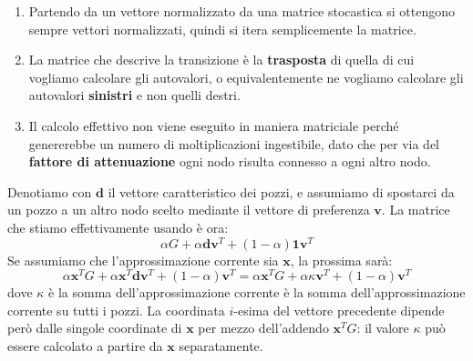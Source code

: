 \documentclass[\main/main.tex]{subfiles}
\begin{document}
\begin{multicols}{2}
\begin{observation}
    \begin{enumerate}
        \item Partendo da un vettore normalizzato da una matrice stocastica si ottengono sempre vettori normalizzati, quindi si itera semplicemente la matrice.
        \item La matrice che descrive la transizione è la \textbf{trasposta} di quella di cui vogliamo calcolare gli autovalori, o equivalentemente ne vogliamo calcolare gli autovalori \textbf{sinistri} e non quelli destri.
        \item Il calcolo effettivo non viene eseguito in maniera matriciale perché genererebbe un numero di moltiplicazioni ingestibile, dato che per via del \textbf{fattore di attenuazione} ogni nodo risulta connesso a ogni altro nodo.
    \end{enumerate}
\end{observation}
\begin{observation}
    Denotiamo con \(\bm{d}\) il vettore caratteristico dei pozzi, e assumiamo di spostarci da un pozzo a un altro nodo scelto mediante il vettore di preferenza \(\bm{v}\). La matrice che stiamo effettivamente usando è ora:
    \[
        \alpha G+\alpha \bm{d} \bm{v}^{T}+(1-\alpha) \bm{1} \bm{v}^{T}
    \]
    Se assumiamo che l'approssimazione corrente sia \(\bm{x}\), la prossima sarà:
    \[
        \alpha \boldsymbol{x}^{T} G+\alpha \boldsymbol{x}^{T} \boldsymbol{d} \boldsymbol{v}^{T}+(1-\alpha) \boldsymbol{v}^{T}=\alpha \boldsymbol{x}^{T} G+\alpha \kappa \boldsymbol{v}^{T}+(1-\alpha) \boldsymbol{v}^{T}
    \]
    dove \(\kappa\) è la somma dell'approssimazione corrente è la somma dell'approssimazione corrente su tutti i pozzi. La coordinata \(i\)-esima del vettore precedente dipende però dalle singole coordinate di \(\bm{x}\) per mezzo dell'addendo \(\boldsymbol{x}^{T} G\): il valore \(\kappa\) può essere calcolato a partire da \(\bm{x}\) separatamente.
    

\end{observation}
\end{multicols}
\end{document}

